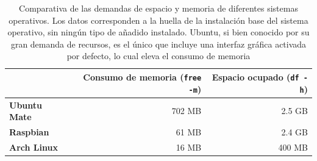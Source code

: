 \begin{table}[H]
\centering
\begin{tabular}{|l|r|r|}
\hline
&\textbf{Consumo de memoria (\texttt{free -m})} &\textbf{Espacio ocupado (\texttt{df -h})}\\
\hline
\textbf{Ubuntu Mate}&702 MB&2.5 GB\\
\hline
\textbf{Raspbian}&61 MB&2.4 GB\\
\hline
\textbf{Arch Linux}&16 MB&400 MB\\
\hline
\end{tabular}
\caption[Comparativa de las demandas de espacio y memoria de diferentes sistemas operativos]{Comparativa de las demandas de espacio y memoria de diferentes sistemas operativos. Los datos corresponden a la huella de la instalación base del sistema operativo, sin ningún tipo de añadido instalado. Ubuntu, si bien conocido por su gran demanda de recursos, es el único que incluye una interfaz gráfica activada por defecto, lo cual eleva el consumo de memoria}
\label{os:footprint}
\end{table}

